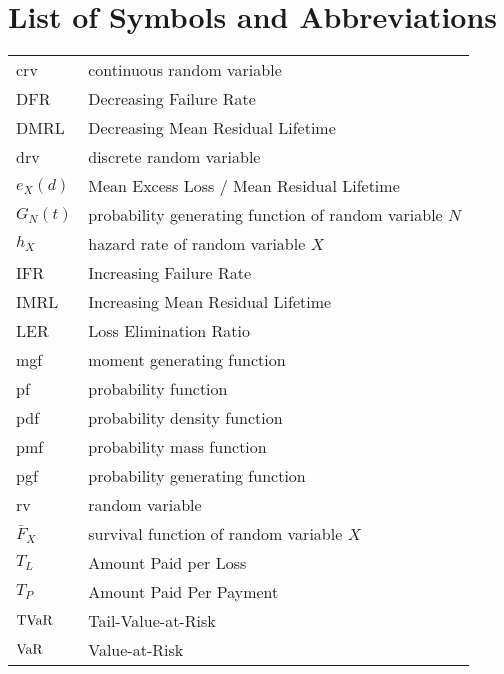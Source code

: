 \chapter{List of Symbols and Abbreviations}%
\label{chp:list_of_symbols_and_abbreviations}

\begin{longtable}{l l}
  crv         & continuous random variable \\
  DFR         & Decreasing Failure Rate \\
  DMRL        & Decreasing Mean Residual Lifetime \\
  drv         & discrete random variable \\
  $e_X(d)$    & Mean Excess Loss / Mean Residual Lifetime \\
  $G_N(t)$    & probability generating function of random variable $N$ \\
  $h_X$       & hazard rate of random variable $X$ \\
  IFR         & Increasing Failure Rate \\
  IMRL        & Increasing Mean Residual Lifetime \\
  LER         & Loss Elimination Ratio \\
  mgf         & moment generating function \\
  pf          & probability function \\
  pdf         & probability density function \\
  pmf         & probability mass function \\
  pgf         & probability generating function \\
  rv          & random variable \\
  $\bar{F}_X$ & survival function of random variable $X$ \\
  $T_L$       & Amount Paid per Loss \\
  $T_P$       & Amount Paid Per Payment \\
  $\operatorname{TVaR}$     & Tail-Value-at-Risk \\
  $\operatorname{VaR}$      & Value-at-Risk
\end{longtable}

